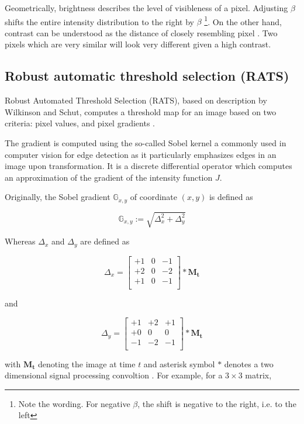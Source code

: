 \documentclass[pdftex,12pt,a4paper]{report}
\begin{document}
Geometrically, brightness describes the level of visibleness of a pixel. Adjusting $\beta$ shifts the entire intensity distribution to the right by $\beta$ \footnote{Note the wording. For negative $\beta$, the shift is negative to the right, i.e. to the left}. On the other hand, contrast can be understood as the distance of closely resembling pixel \cite{hartley2003multiple}. Two pixels which are very similar will look very different given a high contrast.

\subsection{Robust automatic threshold selection (RATS)}
\label{subsubsection:rats}


Robust Automated Threshold Selection (RATS), based on description by Wilkinson and Schut\cite{wilkinson1998digital}, computes a threshold map for an image based on two criteria: pixel values, and pixel gradients \cite{fiji2017rats}.

The gradient is computed using the so-called Sobel kernel \cite{sobel1990isotropic} a commonly used in computer vision for edge detection as it particularly emphasizes edges in an image upon transformation. It is a discrete differential operator which computes an approximation of the gradient of the intensity function $J$.

Originally, the Sobel gradient $\mathbb{G}_{x, y}$ of coordinate $(x, y)$ is defined as

$$
\mathbb{G}_{x, y} := \sqrt{\Delta_x^2 + \Delta_y^2}
$$

Whereas $\Delta_x$ and $\Delta_y$ are defined as

\[
\Delta_x = 
\begin{bmatrix}
+1 & 0 & -1 \\
+2 & 0 & -2 \\
+1 & 0 & -1 \\
\end{bmatrix}
*
\mathbf{M_t}
\]

and

\[
\Delta_y = 
\begin{bmatrix}
+1 & +2 & +1 \\
+0 & 0 & 0 \\
-1 & -2 & -1 \\
\end{bmatrix}
*
\mathbf{M_t}
\]

with $\mathbf{M_t}$ denoting the image at time $t$ and asterisk symbol $*$ denotes  a two dimensional signal processing convoltion \cite{smith1997scientist}. For example, for a $3 \times 3$ matrix,
\end{document}
